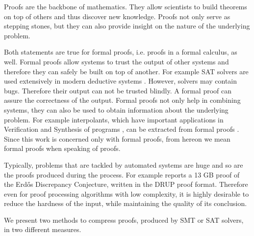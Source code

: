 Proofs are the backbone of mathematics. 
They allow scientists to build theorems on top of others and thus discover new knowledge.
Proofs not only serve as stepping stones, but they can also provide insight on the nature of the underlying problem.

Both statements are true for formal proofs, i.e. proofs in a formal calculus, as well.
Formal proofs allow systems to trust the output of other systems and therefore they can safely be built on top of another. 
For example SAT solvers are used extensively in modern deductive systems \cite{Biere2009}. 
However, solvers may contain bugs. 
Therefore their output can not be trusted blindly.
A formal proof can assure the correctness of the output.
Formal proofs not only help in combining systems, they can also be used to obtain information about the underlying problem.
For example interpolants, which have important applications in Verification and Synthesis of programs \cite{McMill2005}, can be extracted from formal proofs \cite{Hofferek2013}.
Since this work is concerned only with formal proofs, from hereon we mean formal proofs when speaking of proofs.

Typically, problems that are tackled by automated systems are huge and so are the proofs produced during the process.
For example \cite{Konev2014} reports a 13 GB proof of the Erd\H{o}s Discrepancy Conjecture, written in the DRUP proof format.
Therefore even for proof processing algorithms with low complexity, it is highly desirable to reduce the hardness of the input, while maintaining the quality of its conclusion.

We present two methods to compress proofs, produced by SMT or SAT solvers, in two different measures.


